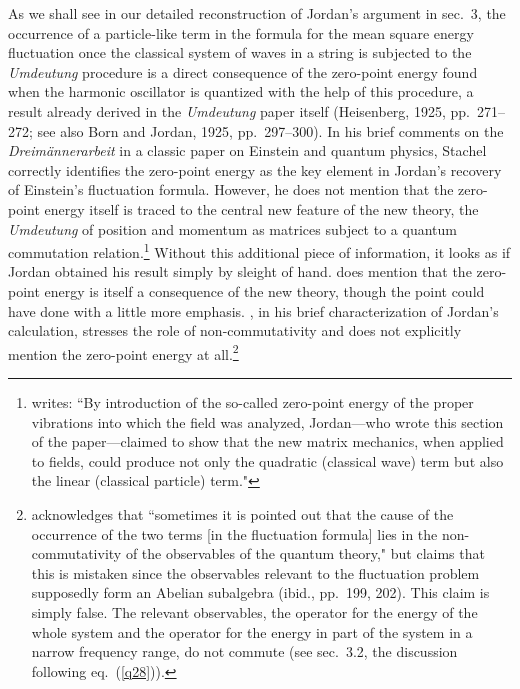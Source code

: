 \documentclass[12pt]{elsart}
\begin{document}
As we shall see in our detailed reconstruction of Jordan's argument in sec.\ 3, the occurrence of a particle-like term in the formula for the mean square energy fluctuation once the classical system of waves in a string is subjected to the {\it Umdeutung} procedure is a direct consequence of  the zero-point energy found when the harmonic oscillator is quantized with the help of this procedure, a result already derived in the {\it Umdeutung} paper itself (Heisenberg, 1925, pp.\ 271--272; see also Born and Jordan, 1925, pp.\ 297--300). In his brief comments on the {\it Dreim\"annerarbeit} in a classic paper on Einstein and quantum physics, Stachel correctly identifies the zero-point energy as the key element in Jordan's recovery of Einstein's fluctuation formula. However, he does not mention that the zero-point energy itself is traced to the central new feature of the new theory, the {\it Umdeutung} of position and momentum as matrices subject to a quantum commutation relation.\footnote{\citet[p.\ 379]{Stachel 1986} writes: ``By introduction of the so-called zero-point energy of the proper vibrations into which the field was analyzed, Jordan---who wrote this section of the paper---claimed to show that the new matrix mechanics, when applied to fields, could produce not only the quadratic (classical wave) term but also the linear (classical particle) term."} Without this additional piece of information, it looks as if Jordan obtained his result simply by sleight of hand. \citet[p.\ 212]{Kojevnikov 1990} does mention that the zero-point energy is itself a consequence of the new theory, though the point could have done with a little more emphasis. \citet[p.\ 222]{Darrigol 1986},  in his brief characterization of Jordan's calculation, stresses the role of non-commutativity  and does not explicitly mention the zero-point energy at all.\footnote{\label{abelian} \citet[p.\ 199]{Bach 1989} acknowledges that ``sometimes it is pointed out that the cause of the occurrence of the two terms [in the fluctuation formula] lies in the non-commutativity of the observables of the quantum theory," but claims that this is mistaken since the observables relevant to the fluctuation problem supposedly form an Abelian subalgebra (ibid., pp.\ 199, 202). This claim is simply false. The relevant observables, the operator for the energy of the whole system and the operator for the energy in part of the system in a narrow frequency range, do not commute (see sec.\ 3.2, the discussion following eq.\ (\ref{q28})).}
\end{document}
